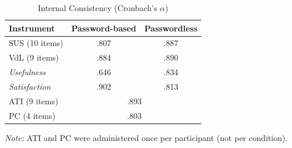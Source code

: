 \documentclass{article}
\begin{document}
\begin{table}[htbp]
    \centering
    \begin{threeparttable}
        \caption{Internal Consistency (Cronbach's $\alpha$)}
        \label{tab:cronbach}
        \begin{tabular}{lcc}
            \toprule
            \textbf{Instrument} & \textbf{Password-based} & \textbf{Passwordless} \\
            \midrule
            SUS (10 items)        & .807  & .887 \\
            VdL (9 items)         & .884  & .890 \\
            \quad \textit{Usefulness}   & .646  & .834 \\
            \quad \textit{Satisfaction} & .902  & .813 \\
            \midrule
            ATI (9 items)         & \multicolumn{2}{c}{.893} \\
            PC (4 items)          & \multicolumn{2}{c}{.803} \\
            \bottomrule
        \end{tabular}
        \begin{tablenotes}
            \small
            \item \textit{Note:} ATI and PC were administered once per participant (not per condition). 
        \end{tablenotes}
    \end{threeparttable}
\end{table}
\end{document}
